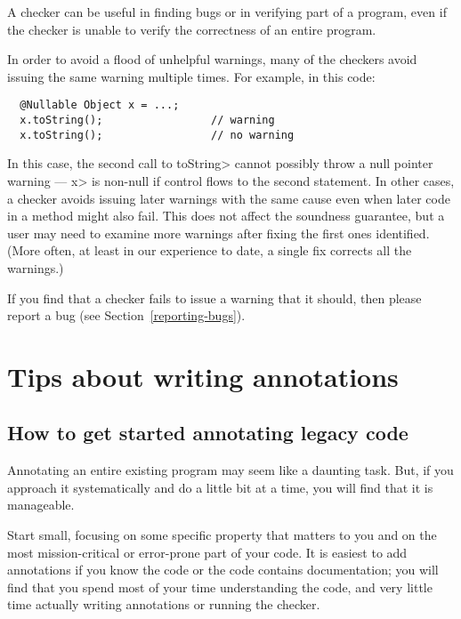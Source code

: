 A checker can be useful in finding bugs or in verifying part of a
program, even if the checker is unable to verify the correctness of an
entire program.

In order to avoid a flood of unhelpful warnings, many of the checkers avoid
issuing the same warning multiple times.  For example, in this code:

\begin{Verbatim}
  @Nullable Object x = ...;
  x.toString();                 // warning
  x.toString();                 // no warning
\end{Verbatim}

\noindent
In this case, the second call to \<toString> cannot possibly throw a null
pointer warning --- \<x> is non-null if control flows to the second
statement.
In other cases, a checker avoids issuing later warnings with the same cause
even when later code in a method might also fail.
This does not
affect the soundness guarantee, but a user may need to examine more
warnings after fixing the first ones identified.  (More often, at least in
our experience to date, a single fix corrects all the warnings.)


If you find that a checker fails to issue a warning that it
should, then please report a bug (see Section~\ref{reporting-bugs}).


\section{Tips about writing annotations\label{tips-about-writing-annotations}}


\subsection{How to get started annotating legacy code\label{get-started-with-legacy-code}}

Annotating an entire existing program may seem like a daunting task.  But,
if you approach it systematically and do a little bit at a time, you will
find that it is manageable.

Start small, focusing on some specific property that matters to you and
on the most mission-critical or error-prone part of your code.
It is easiest to add annotations if you know the code or the
code contains documentation; you will find that you spend most of your time
understanding the code, and very little time actually writing annotations
or running the checker.

